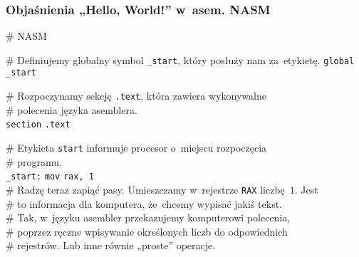 \documentclass[10pt,t]{beamer}
\begin{document}
\begin{frame}
  \frametitle{Objaśnienia „Hello, World!” w~asem. NASM
    \parencite{Toal-NASM-Tutorial-Ver-2024}}


  \# NASM

  \# Definiujemy globalny symbol \texttt{\_start}, który posłuży nam
  za~etykietę.
  \hphantom{aaaaaaaaa} \texttt{global} \hphantom{aa} \texttt{\_start} \\
  \vspace{0.8em}

  \# Rozpoczynamy sekcję \texttt{.text}, która zawiera wykonywalne \\
  \# polecenia języka asemblera. \\
  \hphantom{aaaaaaaaa} \texttt{section} \hphantom{a} \texttt{.text}

  \# Etykieta \texttt{start} informuje procesor o~miejscu rozpoczęcia \\
  \# programu. \\
  \texttt{\_start:} \hphantom{a} \hspace{-0.14em}
  \texttt{mov} \hphantom{aaaaaa} \texttt{rax, 1} \\
  \# Radzę teraz zapiąć pasy. Umieszczamy w~rejestrze \texttt{RAX}
  liczbę~$1$. Jest \\
  \# to informacja dla komputera, że~chcemy wypisać jakiś tekst. \\
  \# Tak, w~języku asembler przekazujemy komputerowi polecenia, \\
  \# poprzez ręczne wpisywanie określonych liczb do odpowiednich \\
  \# rejestrów. Lub inne równie „proste” operacje.

\end{frame}
\end{document}
